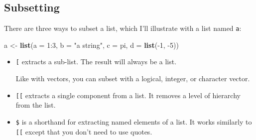 \documentclass[]{book}
\newenvironment{Shaded}{\begin{snugshade}}{\end{snugshade}}
\newcommand{\KeywordTok}[1]{\textcolor[rgb]{0.13,0.29,0.53}{\textbf{{#1}}}}
\newcommand{\DataTypeTok}[1]{\textcolor[rgb]{0.13,0.29,0.53}{{#1}}}
\newcommand{\DecValTok}[1]{\textcolor[rgb]{0.00,0.00,0.81}{{#1}}}
\newcommand{\StringTok}[1]{\textcolor[rgb]{0.31,0.60,0.02}{{#1}}}
\newcommand{\CommentTok}[1]{\textcolor[rgb]{0.56,0.35,0.01}{\textit{{#1}}}}
\newcommand{\NormalTok}[1]{{#1}}
\begin{document}
\hypertarget{subsetting-1}{\subsection{Subsetting}\label{subsetting-1}}

There are three ways to subset a list, which I'll illustrate with a list
named \texttt{a}:

\begin{Shaded}
\begin{Highlighting}[]
\NormalTok{a <-}\StringTok{ }\KeywordTok{list}\NormalTok{(}\DataTypeTok{a =} \DecValTok{1}\NormalTok{:}\DecValTok{3}\NormalTok{, }\DataTypeTok{b =} \StringTok{"a string"}\NormalTok{, }\DataTypeTok{c =} \NormalTok{pi, }\DataTypeTok{d =} \KeywordTok{list}\NormalTok{(-}\DecValTok{1}\NormalTok{, -}\DecValTok{5}\NormalTok{))}
\end{Highlighting}
\end{Shaded}

\begin{itemize}
\item
  \texttt{{[}} extracts a sub-list. The result will always be a list.

\begin{Shaded}
\end{Shaded}

  Like with vectors, you can subset with a logical, integer, or
  character vector.
\item
  \texttt{{[}{[}} extracts a single component from a list. It removes a
  level of hierarchy from the list.

\begin{Shaded}
\end{Shaded}
\item
  \texttt{\$} is a shorthand for extracting named elements of a list. It
  works similarly to \texttt{{[}{[}} except that you don't need to use
  quotes.

\begin{Shaded}
\end{Shaded}
\end{itemize}
\end{document}
